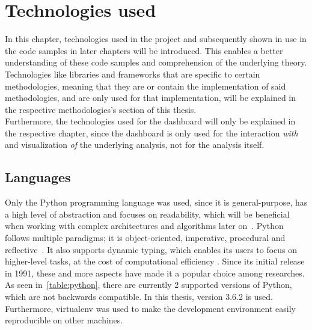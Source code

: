 
\chapter{Technologies used}
\label{ch:technologiesUsed}

In this chapter, technologies used in the project and subsequently shown in use in the code samples in later chapters will be introduced.
This enables a better understanding of these code samples and comprehension of the underlying theory.
\\
Technologies like libraries and frameworks that are specific to certain methodologies,
meaning that they are or contain the implementation of said methodologies,
and are only used for that implementation,
will be explained in the respective methodologies's section of this thesis.
\\
Furthermore, the technologies used for the dashboard will only be explained in the respective chapter,
since the dashboard is only used for the interaction \textit{with} and visualization \textit{of} the underlying analysis,
not for the analysis itself.

\section{Languages}
\label{sec:languages}

Only the Python programming language was used, since it is general-purpose,
has a high level of abstraction and focuses on readability,
which will be beneficial when working with complex architectures and algorithms later on~\cite{pythonDocs}.
Python follows multiple paradigms;
it is object-oriented, imperative, procedural and reflective~\cite{van2007python}.
It also supports dynamic typing, which enables its users to focus on higher-level tasks, at the cost of computational efficiency \cite{Perez-schofield2010}.
Since its initial release in 1991, these and more aspects have made it a popular choice among researches.
As seen in~\autoref{table:python}, there are currently 2 supported versions of Python, which are not backwards compatible.
In this thesis, version 3.6.2 is used.
Furthermore, virtualenv was used to make the development environment easily reproducible on other machines.

